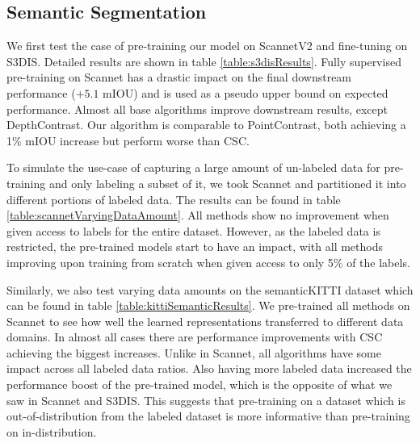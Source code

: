 \documentclass[10pt,twocolumn,letterpaper]{article}
\begin{document}
\subsection{Semantic Segmentation}
\label{sec:results:semantic}

We first test the case of pre-training our model on ScannetV2 and fine-tuning on S3DIS. Detailed results are shown in table \ref{table:s3disResults}. Fully supervised pre-training on Scannet has a drastic impact on the final downstream performance ($+5.1$ mIOU) and is used as a pseudo upper bound on expected performance. Almost all base algorithms improve downstream results, except DepthContrast. Our algorithm is comparable to PointContrast, both achieving a 1\% mIOU increase but perform worse than CSC.

To simulate the use-case of capturing a large amount of un-labeled data for pre-training and only labeling a subset of it, we took Scannet and partitioned it into different portions of labeled data. The results can be found in table \ref{table:scannetVaryingDataAmount}. All methods show no improvement when given access to labels for the entire dataset. However, as the labeled data is restricted, the pre-trained models start to have an impact, with all methods improving upon training from scratch when given access to only 5\% of the labels.

Similarly, we also test varying data amounts on the semanticKITTI dataset which can be found in table \ref{table:kittiSemanticResults}. We pre-trained all methods on Scannet to see how well the learned representations transferred to different data domains. In almost all cases there are performance improvements with CSC achieving the biggest increases. Unlike in Scannet, all algorithms have some impact across all labeled data ratios. Also having more labeled data increased the performance boost of the pre-trained model, which is the opposite of what we saw in Scannet and S3DIS. This suggests that pre-training on a dataset which is out-of-distribution from the labeled dataset is more informative than pre-training on in-distribution.
\end{document}
